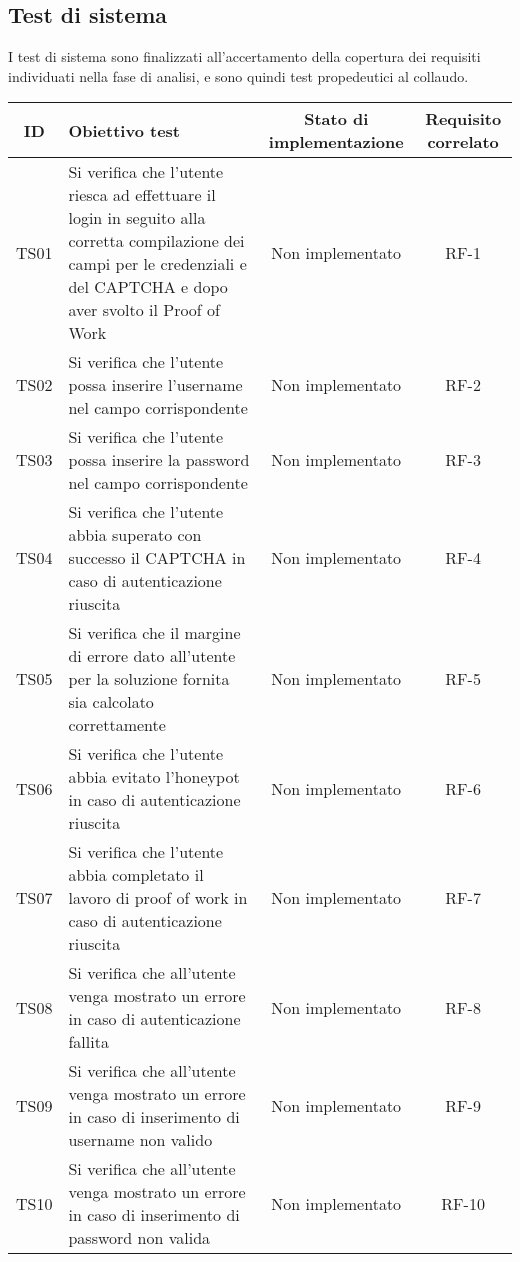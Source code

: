\subsection{Test di sistema}
I test di sistema sono finalizzati all'accertamento della copertura dei requisiti individuati nella fase di analisi, e sono quindi test propedeutici al collaudo.
\newpage
\begin{center}
	\setlength\extrarowheight{5pt}
	\begin{xltabular}{\textwidth}{|c|X|c|c|}
		\hline
		\textbf{ID} & \textbf{Obiettivo test} & \textbf{Stato di implementazione} & \textbf{Requisito correlato}\\
		\hline
		TS01 & Si verifica che l’utente riesca ad effettuare
		il login in seguito alla corretta compilazione dei campi per le credenziali e del CAPTCHA e dopo aver svolto il Proof of Work & Non implementato & RF-1\\
		\hline
		TS02 & Si verifica che l'utente possa inserire l'username nel campo corrispondente & Non implementato & RF-2\\
		\hline
		TS03 & Si verifica che l'utente possa inserire la password nel campo corrispondente & Non implementato & RF-3\\
		\hline
		TS04 & Si verifica che l'utente abbia superato con successo il CAPTCHA in caso di autenticazione riuscita & Non implementato & RF-4\\
		\hline
		TS05 & Si verifica che il margine di errore dato all'utente per la soluzione fornita sia calcolato correttamente & Non implementato & RF-5\\
		\hline
		TS06 & Si verifica che l'utente abbia evitato l'honeypot in caso di  autenticazione riuscita & Non implementato & RF-6\\
		\hline
		TS07 & Si verifica che l'utente abbia completato il lavoro di proof of work in caso di autenticazione riuscita & Non implementato & RF-7\\
		\hline
		TS08 & Si verifica che all’utente venga mostrato un errore in caso di autenticazione fallita & Non implementato & RF-8\\
		\hline
		TS09 & Si verifica che all’utente venga mostrato un errore in caso di inserimento di username non valido & Non implementato & RF-9\\
		\hline
		TS10 & Si verifica che all’utente venga mostrato un errore in caso di inserimento di password non valida & Non implementato & RF-10\\

\end{xltabular}
\end{center}
